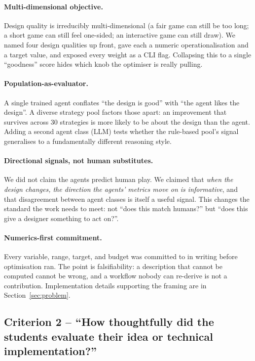 \documentclass[10pt]{article}
\begin{document}
\paragraph{Multi-dimensional objective.} Design quality is
irreducibly multi-dimensional (a fair game can still be too long;
a short game can still feel one-sided; an interactive game can still
draw). We named four design qualities up front, gave each a numeric
operationalisation and a target value, and exposed every weight as
a CLI flag. Collapsing this to a single ``goodness'' score hides
which knob the optimiser is really pulling.

\paragraph{Population-as-evaluator.} A single trained agent
conflates ``the design is good'' with ``the agent likes the
design''. A diverse strategy pool factors those apart: an
improvement that survives across 30 strategies is more likely to be
about the design than the agent. Adding a second agent class
(LLM) tests whether the rule-based pool's signal generalises to a
fundamentally different reasoning style.

\paragraph{Directional signals, not human substitutes.} We did
not claim the agents predict human play. We claimed that
\emph{when the design changes, the direction the agents' metrics
move on is informative}, and that disagreement between agent
classes is itself a useful signal. This changes the standard the
work needs to meet: not ``does this match humans?'' but ``does
this give a designer something to act on?''.

\paragraph{Numerics-first commitment.} Every variable, range,
target, and budget was committed to in writing before optimisation
ran. The point is falsifiability: a description that cannot be
computed cannot be wrong, and a workflow nobody can re-derive is
not a contribution. Implementation details supporting the framing
are in Section~\ref{sec:problem}.

\subsection*{Criterion 2 -- ``How thoughtfully did the students evaluate
their idea or technical implementation?''}
\end{document}
